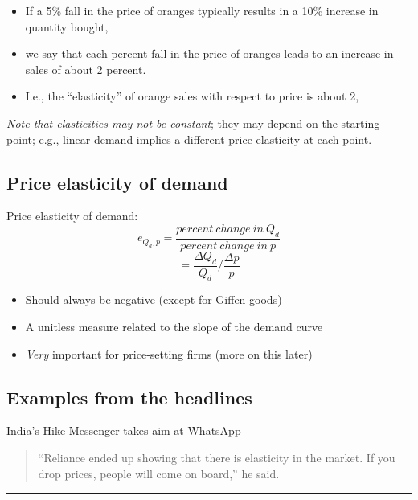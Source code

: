 \documentclass[]{article}
\providecommand{\tightlist}{%
  \setlength{\itemsep}{0pt}\setlength{\parskip}{0pt}}
\begin{document}
\begin{itemize}
\tightlist
\item
  If a 5\% fall in the price of oranges typically results in a 10\%
  increase in quantity bought,
\item
  we say that each percent fall in the price of oranges leads to an
  increase in sales of about 2 percent.
\item
  I.e., the ``elasticity'' of orange sales with respect to price is
  about 2,
\end{itemize}

\emph{Note that elasticities may not be constant}; they may depend on
the starting point; e.g., linear demand implies a different price
elasticity at each point.

\hypertarget{price-elasticity-of-demand}{%
\subsection{Price elasticity of
demand}\label{price-elasticity-of-demand}}

Price elasticity of demand:
\[e_{Q_d,p} = \frac{percent \ change \ in \ Q_d}{percent \ change \ in \ p} \]
\[  = \frac{\Delta Q_d}{Q_d}/\frac{\Delta p}{p}\]

\begin{itemize}
\tightlist
\item
  Should always be negative (except for Giffen goods)
\item
  A unitless measure related to the slope of the demand curve
\item
  \emph{Very} important for price-setting firms (more on this later)
\end{itemize}

\hypertarget{examples-from-the-headlines}{%
\subsection{Examples from the
headlines}\label{examples-from-the-headlines}}

\href{https://www.ft.com/content/2665c794-76a0-11e6-b60a-de4532d5ea35}{India's
Hike Messenger takes aim at WhatsApp}

\begin{quote}
``Reliance ended up showing that there is elasticity in the market. If
you drop prices, people will come on board,'' he said.
\end{quote}

\begin{center}\rule{0.5\linewidth}{\linethickness}\end{center}
\end{document}
